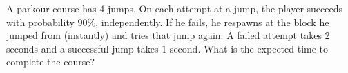 A parkour course has $4$ jumps. On each attempt at a jump, the player succeeds with probability $90\%$, independently. If he fails, he respawns at the block he jumped from (instantly) and tries that jump again. A failed attempt takes $2$ seconds and a successful jump takes $1$ second. What is the expected time to complete the course?
